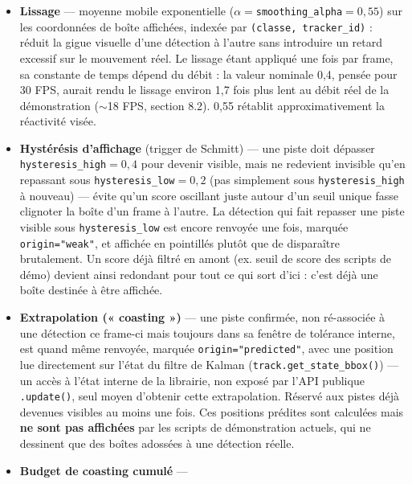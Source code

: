 \documentclass[11pt,a4paper]{article}
\begin{document}
    \begin{itemize}[leftmargin=1.5em]
      \item \textbf{Lissage} --- moyenne mobile exponentielle
        ($\alpha=$\texttt{smoothing\_alpha}$=0,55$) sur les coordonnées de
        boîte affichées, indexée par \texttt{(classe, tracker\_id)} : réduit
        la gigue visuelle d'une détection à l'autre sans introduire un
        retard excessif sur le mouvement réel. Le lissage étant appliqué une
        fois par frame, sa constante de temps dépend du débit : la valeur
        nominale 0,4, pensée pour 30 FPS, aurait rendu le lissage environ
        1,7 fois plus lent au débit réel de la démonstration ($\sim$18 FPS,
        section 8.2). 0,55 rétablit approximativement la réactivité visée.
      \item \textbf{Hystérésis d'affichage} (trigger de Schmitt) --- une
        piste doit dépasser \texttt{hysteresis\_high}$=0,4$ pour devenir
        visible, mais ne redevient invisible qu'en repassant sous
        \texttt{hysteresis\_low}$=0,2$ (pas simplement sous
        \texttt{hysteresis\_high} à nouveau) --- évite qu'un score oscillant
        juste autour d'un seuil unique fasse clignoter la boîte d'un frame à
        l'autre. La détection qui fait repasser une piste visible sous
        \texttt{hysteresis\_low} est encore renvoyée une fois, marquée
        \texttt{origin="weak"}, et affichée en pointillés plutôt que de
        disparaître brutalement. Un score déjà filtré en amont (ex. seuil
        de score des scripts de démo) devient ainsi redondant pour tout ce
        qui sort d'ici : c'est déjà une boîte destinée à être affichée.
      \item \textbf{Extrapolation (« coasting »)} --- une piste confirmée,
        non ré-associée à une détection ce frame-ci mais toujours dans sa
        fenêtre de tolérance interne, est quand même renvoyée, marquée
        \texttt{origin="predicted"}, avec une position lue directement sur
        l'état du filtre de Kalman (\texttt{track.get\_state\_bbox()}) ---
        un accès à l'état interne de la librairie, non exposé par l'API
        publique \texttt{.update()}, seul moyen d'obtenir cette
        extrapolation. Réservé aux pistes déjà devenues visibles au moins
        une fois. Ces positions prédites sont calculées mais \textbf{ne sont
        pas affichées} par les scripts de démonstration actuels, qui ne
        dessinent que des boîtes adossées à une détection réelle.
      \item \textbf{Budget de coasting cumulé} ---

\end{itemize}
\end{document}
